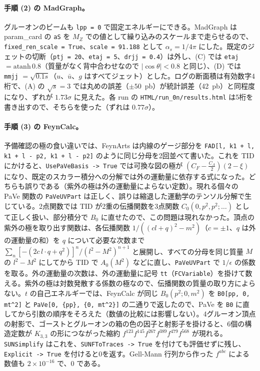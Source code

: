 \documentclass[a4paper,10pt]{ltjsarticle}
\begin{document}
\paragraph{手順 (2) の MadGraph。}グルーオンのビームも \texttt{lpp = 0} で固定エネルギーにできる。MadGraph は param\_card の \texttt{aS} を $M_Z$ での値として繰り込みのスケールまで走らせるので、\texttt{fixed\_ren\_scale = True}、\texttt{scale = 91.188} として $\alpha_s=1/4\pi$ にした。既定のジェットの切断（\texttt{ptj = 20}、\texttt{etaj = 5}、\texttt{drjj = 0.4}）は外し、(C) では \texttt{etaj} $=\mathrm{atanh}\,0.8$（質量がなく背中合わせなので $|\cos\theta|<0.8$ と同じ）、(D) では \texttt{mmjj} $=\sqrt{0.1s}$（$u$、$\bar u$、$g$ はすべてジェット）とした。ログの断面積は有効数字4桁で、(A) の $\sqrt s=3$ では丸めの誤差（$\pm50$~pb）が統計誤差（42~pb）と同程度になり、ずれが $1.73\sigma$ に見えた。各 run の \texttt{HTML/run\_0n/results.html} は5桁を書き出すので、そちらを使った（ずれは $0.77\sigma$）。

\paragraph{手順 (3) の FeynCalc。}予備確認の極の食い違いでは、FeynArts は内線のゲージ部分を \texttt{FAD[l, k1 + l, k1 + l - p2, k1 + l - p2]} のように同じ分母を2回並べて書いた。これを TID にかけると、\texttt{UsePaVeBasis -> True} では可換な図の極が $(C_F-\frac{C_A}2)(2-\xi)$ になり、既定のスカラー積分への分解では外の運動量に依存する式になった。どちらも誤りである（紫外の極は外の運動量によらない定数）。現れる個々の PaVe 関数の \texttt{PaVeUVPart} は正しく、誤りは縮退した運動学のテンソル分解で生じている。2点関数では TID が2重の伝播関数を3点関数 $C_0(0,p^2,p^2;\dots)$ として正しく扱い、部分積分で $B_0$ に直せたので、この問題は現れなかった。頂点の紫外の極を取り出す関数は、各伝播関数 $1/((cl+q)^2-m^2)$（$c=\pm1$、$q$ は外の運動量の和）を $q$ について必要な次数まで $\sum_n[-(2c\,l\cdot q+q^2)]^n/(l^2-M^2)^{n+1}$ と展開し、すべての分母を同じ質量 $M$ の $l^2-M^2$ にしてから TID で $A_0(M^2)$ などに直し、\texttt{PaVeUVPart} で $1/\epsilon$ の係数を取る。外の運動量の次数は、外の運動量に記号 \texttt{tt}（\texttt{FCVariable}）を掛けて数える。紫外の極は対数発散する係数の極なので、伝播関数の質量の取り方によらない。$t$ の自己エネルギーでは、FeynCalc が同じ $B_0(p^2;0,m^2)$ を \texttt{B0[pp, 0, mt\^{}2]} と \texttt{PaVe[0, \{pp\}, \{0, mt\^{}2\}]} の二通りで返したので、PaVe を \texttt{B0} に直してから引数の順序をそろえた（数値の比較には影響しない）。4グルーオン頂点の射影で、ゴーストとグルーオンの箱の色の因子と射影子を掛けると、6個の構造定数が $K_{3,3}$ の形につながった縮約 $f^{123}f^{145}f^{267}f^{389}f^{479}f^{568}$ が現れる。\texttt{SUNSimplify} はこれを、\texttt{SUNFToTraces -> True} を付けても評価せずに残し、\texttt{Explicit -> True} を付けると0を返す。Gell-Mann 行列から作った $f^{abc}$ による数値も $2\times10^{-16}$ で、0 である。
\end{document}
